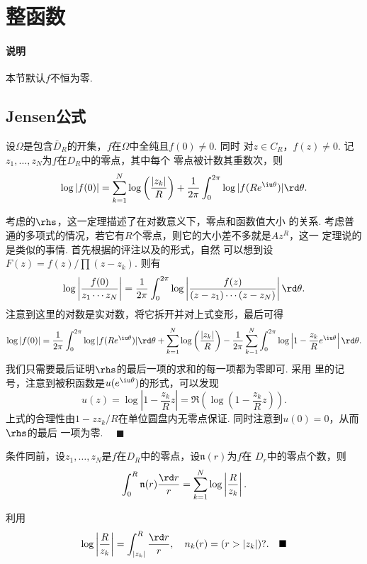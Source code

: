 \section{整函数}
  \paragraph{说明}
    本节默认$f$不恒为零.

\subsection{Jensen公式}

  \begin{thm}[Jensen]
    \label{thm: Jensen}
    设$\Omega$是包含$\bar{D}_R$的开集，$f$在$\Omega$中全纯且$f(0)\ne 0$. 同时
    对$z\in C_R$，$f(z)\ne 0$. 记$z_1,\dots,z_N$为$f$在$D_R$中的零点，其中每个
    零点被计数其重数次，则
    \begin{equation}
      \label{equ: Jensen}
      \log|f(0)| = \sum_{k=1}^N\log\left( \frac{|z_k|}{R} \right)
      + \frac{1}{2\pi}\int_0^{2\pi}\log|f(Re^{\iu\theta})|\rd\theta.
    \end{equation}
  \end{thm}
  \remark
    考虑的$\rhs$，这一定理描述了在对数意义下，零点和函数值大小
    的关系. 考虑普通的多项式的情况，若它有$R$个零点，则它的大小差不多就是$Az^R$，这一
    定理说的是类似的事情.
  \proof
    首先根据的评注以及的形式，自然
    可以想到设$F(z)=f(z)/\prod(z-z_k)$. 则有
    \[
      \log\left|\frac{f(0)}{z_1\cdots z_N}\right| = 
      \frac{1}{2\pi}\int_0^{2\pi}\log\left|
      \frac{f(z)}{(z-z_1)\cdots(z-z_N)}\right|\rd\theta.
    \]
    注意到这里的对数是实对数，将它拆开并对上式变形，最后可得
    \[
      \log|f(0)|=\frac{1}{2\pi}\int_0^{2\pi}\log|f(Re^{\iu\theta})|\rd\theta
      + \sum_{k=1}^N\log\left(\frac{|z_k|}{R}\right)
      - \frac{1}{2\pi}\sum_{k-1}^N\int_0^{2\pi}\log\left|
      1-\frac{z_k}{R}e^{\iu\theta}\right|\rd\theta.
    \]
    我们只需要最后证明$\rhs$的最后一项的求和的每一项都为零即可. 采用
    里的记号，注意到被积函数是$u(e^{\iu\theta})$的形式，可以发现
    \[
      u(z) = \log\left|1-\frac{z_k}{R}z\right| = 
      \Re\left(\log\left(1-\frac{z_k}{R}z\right)\right).
    \]
    上式的合理性由$1-zz_k/R$在单位圆盘内无零点保证. 同时注意到$u(0)=0$，从而$\rhs$的最后
    一项为零. $\quad\blacksquare$

  \begin{lemma}
    条件同前，设$z_1,\dots,z_N$是$f$在$D_R$中的零点，设$\mathfrak{n}(r)$为$f$在
    $D_r$中的零点个数，则
    \[
      \int_0^R \mathfrak{n}(r)\frac{\rd r}{r} = 
      \sum_{k=1}^N\log\left| \frac{R}{z_k} \right|.
    \]
  \end{lemma}
  \proof
    利用
    \[
      \log\left| \frac{R}{z_k} \right|=\int_{|z_k|}^R\frac{\rd r}{r},
      \quad n_k(r) = ( r > |z_k| )?.\quad\blacksquare
    \]

